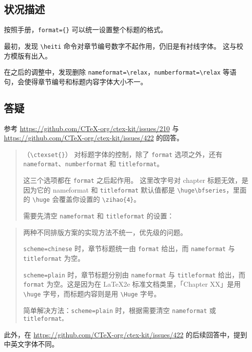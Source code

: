 \documentclass[../Main/thesis.tex]{subfiles}
\begin{document}
\subsection{状况描述}

按照手册，\texttt{format=\{\}} 可以统一设置整个标题的格式。

最初，发现 \texttt{\textbackslash{}heiti}
命令对章节编号数字不起作用，仍旧是有衬线字体。 这与校方模版有出入。

在之后的调整中，发现删除
\texttt{nameformat=\textbackslash{}relax}，\texttt{numberformat=\textbackslash{}relax}
等语句，会使得章节编号和标题内容字体大小不一。

\subsection{答疑}

参考 \url{https://github.com/CTeX-org/ctex-kit/issues/210} 与
\url{https://github.com/CTeX-org/ctex-kit/issues/422} 的回答。

\begin{quote}
（\texttt{\textbackslash{}ctexset\{\}}） 对标题字体的控制，除了
\texttt{format} 选项之外，还有
\texttt{nameformat}、\texttt{numberformat} 和 \texttt{titleformat}。

这三个选项都在 \texttt{format} 之后起作用。 这里改字号对 chapter
标题无效，是因为它的 nameformat 和 \texttt{titleformat} 默认值都是
\texttt{\textbackslash{}huge\textbackslash{}bfseries}，里面的
\texttt{\textbackslash{}huge} 会覆盖你设置的
\texttt{\textbackslash{}zihao\{4\}}。

需要先清空 \texttt{nameformat} 和 \texttt{titleformat} 的设置：
\end{quote}

\begin{quote}
两种不同排版方案的实现方法不统一，优先级的问题。

\texttt{scheme=chinese} 时，章节标题统一由 \texttt{format} 给出，而
\texttt{nameformat} 与 \texttt{titleformat} 为空。

\texttt{scheme=plain} 时，章节标题分别由 \texttt{nameformat} 与
\texttt{titleformat} 给出，而 \texttt{format} 为空。这是因为在 LaTeX2e
标准文档类里，「Chapter XX」是用 \texttt{\textbackslash{}huge}
字号，而标题内容则是用 \texttt{\textbackslash{}Huge} 字号。

简单解决方法：\texttt{scheme=plain} 时，根据需要清空 \texttt{nameformat}
或 \texttt{titleformat。}
\end{quote}

此外，在 \url{https://github.com/CTeX-org/ctex-kit/issues/422}
的后续回答中，提到中英文字体不同。
\end{document}

